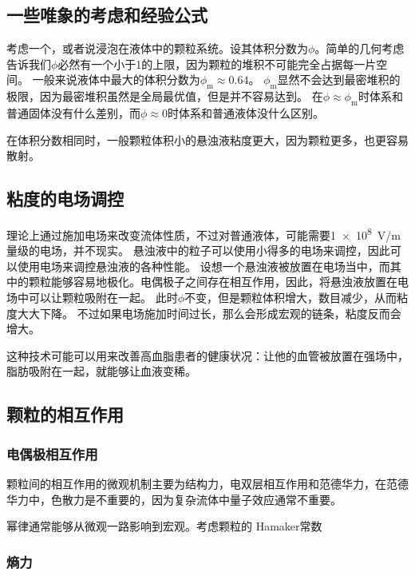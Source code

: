 \subsection{一些唯象的考虑和经验公式}

考虑一个，或者说浸泡在液体中的颗粒系统。设其体积分数为$\phi$。简单的几何考虑告诉我们$\phi$必然有一个小于1的上限，因为颗粒的堆积不可能完全占据每一片空间。
一般来说液体中最大的体积分数为$\phi_\text{m} \approx 0.64$。
$\phi_\text{m}$显然不会达到最密堆积的极限，因为最密堆积虽然是全局最优值，但是并不容易达到。
在$\phi \approx \phi_\text{m}$时体系和普通固体没有什么差别，而$\phi \approx 0$时体系和普通液体没什么区别。

在体积分数相同时，一般颗粒体积小的悬浊液粘度更大，因为颗粒更多，也更容易散射。

\subsection{粘度的电场调控}

理论上通过施加电场来改变流体性质，不过对普通液体，可能需要\SI{1e8}{V/m}量级的电场，并不现实。
悬浊液中的粒子可以使用小得多的电场来调控，因此可以使用电场来调控悬浊液的各种性能。
设想一个悬浊液被放置在电场当中，而其中的颗粒能够容易地极化。电偶极子之间存在相互作用，因此，将悬浊液放置在电场中可以让颗粒吸附在一起。
此时$\phi$不变，但是颗粒体积增大，数目减少，从而粘度大大下降。
不过如果电场施加时间过长，那么会形成宏观的链条，粘度反而会增大。

这种技术可能可以用来改善高血脂患者的健康状况：让他的血管被放置在强场中，脂肪吸附在一起，就能够让血液变稀。

\subsection{颗粒的相互作用}

\subsubsection{电偶极相互作用}

颗粒间的相互作用的微观机制主要为结构力，电双层相互作用和范德华力，在范德华力中，色散力是不重要的，因为复杂流体中量子效应通常不重要。

幂律通常能够从微观一路影响到宏观。考虑颗粒的
Hamaker常数

\subsubsection{熵力}

